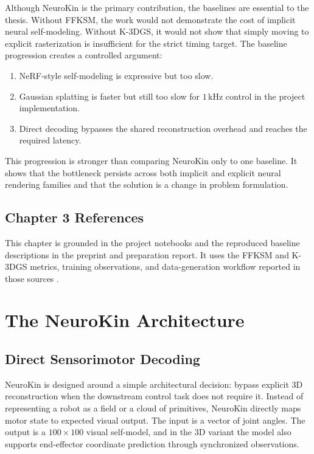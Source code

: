 \documentclass[12pt,a4paper,oneside]{report}
\begin{document}
Although NeuroKin is the primary contribution, the baselines are essential to the thesis. Without FFKSM, the work would not demonstrate the cost of implicit neural self-modeling. Without K-3DGS, it would not show that simply moving to explicit rasterization is insufficient for the strict timing target. The baseline progression creates a controlled argument:
\begin{enumerate}[label=\arabic*.]
  \item NeRF-style self-modeling is expressive but too slow.
  \item Gaussian splatting is faster but still too slow for $1\,\mathrm{kHz}$ control in the project implementation.
  \item Direct decoding bypasses the shared reconstruction overhead and reaches the required latency.
\end{enumerate}
This progression is stronger than comparing NeuroKin only to one baseline. It shows that the bottleneck persists across both implicit and explicit neural rendering families and that the solution is a change in problem formulation.

\section*{Chapter 3 References}

This chapter is grounded in the project notebooks and the reproduced baseline descriptions in the preprint and preparation report. It uses the FFKSM and K-3DGS metrics, training observations, and data-generation workflow reported in those sources \cite{hu2024teaching,mildenhall2020nerf,kerbl20233d,hu2025learning}.

\chapter{The NeuroKin Architecture}

\section{Direct Sensorimotor Decoding}

NeuroKin is designed around a simple architectural decision: bypass explicit 3D reconstruction when the downstream control task does not require it. Instead of representing a robot as a field or a cloud of primitives, NeuroKin directly maps motor state to expected visual output. The input is a vector of joint angles. The output is a $100 \times 100$ visual self-model, and in the 3D variant the model also supports end-effector coordinate prediction through synchronized observations.
\end{document}
